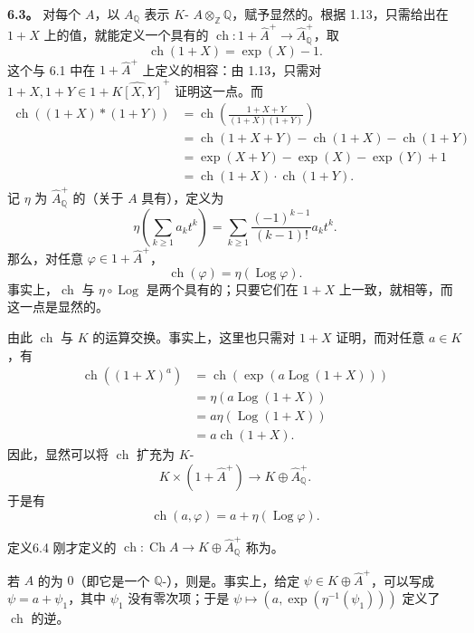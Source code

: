 \textbf{6.3。} 对每个 $A$，以 $A_{\mathbb Q}$ 表示 $K$- $A\otimes_{\mathbb Z}\mathbb Q$，赋予显然的。根据 1.13，只需给出在 $1+X$ 上的值，就能定义一个具有的
$\operatorname{ch}:1+\widehat A^+\longrightarrow\widehat A_{\mathbb Q}^+$，取
\[
\operatorname{ch}(1+X)=\exp(X)-1.
\tag{6.3.1}
\]
这个与 6.1 中在 $1+\widehat A^+$ 上定义的相容：由 1.13，只需对 $1+X,1+Y\in1+\widehat{K[X,Y]}^+$ 证明这一点。而
\[
\begin{aligned}
\operatorname{ch}((1+X)*(1+Y))
 &=\operatorname{ch}\left(\frac{1+X+Y}{(1+X)(1+Y)}\right)\\
 &=\operatorname{ch}(1+X+Y)-\operatorname{ch}(1+X)-\operatorname{ch}(1+Y)\\
 &=\exp(X+Y)-\exp(X)-\exp(Y)+1\\
 &=\operatorname{ch}(1+X)\cdot\operatorname{ch}(1+Y).
\end{aligned}
\]
记 $\eta$ 为 $\widehat A_{\mathbb Q}^+$ 的（关于 $A$ 具有），定义为
\[
\eta\left(\sum_{k\geqslant1}a_kt^k\right)
 =\sum_{k\geqslant1}\frac{(-1)^{k-1}}{(k-1)!}a_kt^k.
\]
那么，对任意 $\varphi\in1+\widehat A^+$，
\[
\operatorname{ch}(\varphi)=\eta(\operatorname{Log}\varphi).
\tag{6.3.2}
\]
事实上，$\operatorname{ch}$ 与 $\eta\circ\operatorname{Log}$ 是两个具有的；只要它们在 $1+X$ 上一致，就相等，而这一点是显然的。

由此 $\operatorname{ch}$ 与 $K$ 的运算交换。事实上，这里也只需对 $1+X$ 证明，而对任意 $a\in K$，有
\[
\begin{aligned}
\operatorname{ch}((1+X)^a)
 &=\operatorname{ch}(\exp(a\operatorname{Log}(1+X)))\\
 &=\eta(a\operatorname{Log}(1+X))\\
 &=a\eta(\operatorname{Log}(1+X))\\
 &=a\operatorname{ch}(1+X).
\end{aligned}
\]
因此，显然可以将 $\operatorname{ch}$ 扩充为 $K$-
\[
K\times(1+\widehat A^+)\longrightarrow K\oplus\widehat A_{\mathbb Q}^+.
\]
于是有
\[
\operatorname{ch}(a,\varphi)=a+\eta(\operatorname{Log}\varphi).
\tag{6.3.3}
\]
\begin{SGAresult}{定义}{6.4}
刚才定义的
$\operatorname{ch}:\operatorname{Ch}A\longrightarrow K\oplus\widehat A_{\mathbb Q}^+$ 称为。
\end{SGAresult}
若 $A$ 的为 $0$（即它是一个 $\mathbb Q$-），则是。事实上，给定 $\psi\in K\oplus\widehat A^+$，可以写成 $\psi=a+\psi_1$，其中 $\psi_1$ 没有零次项；于是
$\psi\longmapsto(a,\exp(\eta^{-1}(\psi_1)))$ 定义了 $\operatorname{ch}$ 的逆。

